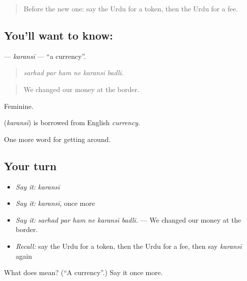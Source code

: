 \label{lesson:UR-C421-karansi}



\begin{quote}
Before the new one: say the Urdu for a token, then the Urdu for a fee.
\end{quote}

\subsection*{You'll want to know: }
\textbf{} — \emph{karansī} — \textquotedblleft{}a currency\textquotedblright{}.

\begin{quote}
     
\end{quote}

\begin{quote}
\emph{sarhad par ham ne karansī badlī.}
\end{quote}

\begin{quote}
We changed our money at the border.
\end{quote}

Feminine.

\begin{cousinweb}
\textbf{} (\emph{karansī}) is borrowed from English \emph{currency}.
\end{cousinweb}

\begin{grammarlens}[title={What you've built}]
One more word for getting around.
\end{grammarlens}

\subsection*{Your turn}
\begin{itemize}
\raggedright
  \item \emph{Say it:} \emph{karansī}
  \item \emph{Say it:} \emph{karansī}, once more
  \item \emph{Say it:} \emph{sarhad par ham ne karansī badlī.} — We changed our money at the border.
  \item \emph{Recall:} say the Urdu for a token, then the Urdu for a fee, then say \emph{karansī} again
\end{itemize}

\begin{tcolorbox}[breakable,colback=teal!4,colframe=teal!35!black,title={Before you move on}]
What does  mean? (\textquotedblleft{}A currency\textquotedblright{}.) Say it once more.
\end{tcolorbox}
